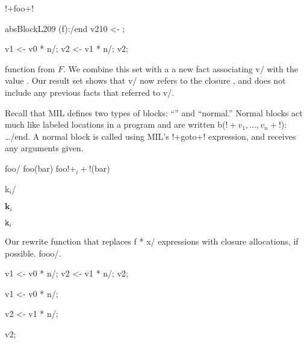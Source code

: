 \documentclass{article}
\begin{document}
!+foo+!
\show\foo
  \begin{AVerb}
    \block absBlockL209 (f):/end
      \vbinds v210 <- \mkclo[absBodyL201:];
      \mkclo[absBodyL202:f]
  \end{AVerb}

\begin{AVerb}
  \vbinds v1 <- \app v0 * n/;
  \vbinds v2 <- \app v1 * n/;
  \return v2; 
\end{AVerb}

function from $F$.  We combine this set with a a new fact associating
\var v/ with the  value \clo[l:v_1, \dots, v_n]. Our result
set shows that \var v/ now refers to the closure \clo[l:v_1, \dots,
  v_n], and does not include any previous facts that referred to \var
v/.

Recall \clo[k0:] 
that MIL defines two types of blocks: ``\cc'' and ``normal.''
Normal blocks act much like labeled locations in a program and are
written \block b($!+v_1, \dots, v_n+!$): \dots/end.  A normal block is
called using MIL's !+goto+! expression, and receives any arguments
given. 

\lab foo/ \goto foo(bar)
\goto foo$!+_i+!$(bar)

\lab k$_i$/ 

\ensuremath{\mathbf k_i}

\ensuremath{\mathtt k_i}

\begin{myfig}
  \caption{Our rewrite function that replaces \app f * x/ expressions
    with closure allocations, if possible. \lab fooo/.}
  \label{uncurry_fig_rewrite}
\end{myfig}

\begin{AVerb}
  \vbinds v1 <- \app v0 * n/;
  \vbinds v2 <- \app v1 * n/;
  \return v2; 
\end{AVerb}

  \binds v1 <- \app v0 * n/;

  \binds v2 <- \app v1 * n/;

  \return v2; 
\listoffigures
\end{document}
